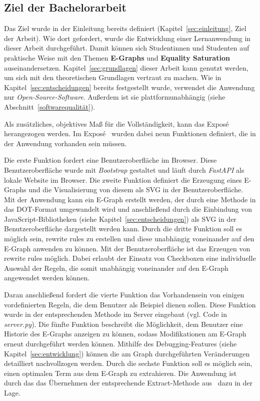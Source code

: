 \subsection{Ziel der Bachelorarbeit}\label{sub:ziel}

Das Ziel wurde in der Einleitung bereits definiert (Kapitel~\ref{sec:einleitung}, Ziel der Arbeit).
Wie dort gefordert, wurde die Entwicklung einer Lernanwendung in dieser Arbeit durchgeführt. Damit können sich Studentinnen und Studenten auf praktische Weise mit den Themen 
\textbf{E-Graphs} und \textbf{Equality Saturation} auseinandersetzen. Kapitel~\ref{sec:grundlagen} dieser Arbeit kann genutzt werden, um sich mit den
theoretischen Grundlagen vertraut zu machen. 
Wie in Kapitel~\ref{sec:entscheidungen} bereits festgestellt wurde, verwendet die Anwendung nur \textit{Open-Source-Software}. Außerdem ist
sie plattformunabhängig (siehe Abschnitt~\ref{softwarequalität}).

Als zusätzliches, objektives Maß für die Vollständigkeit, kann das Exposé herangezogen werden.
Im Exposé~\cite{expose} wurden dabei neun Funktionen definiert, die in der Anwendung vorhanden sein müssen.

Die erste Funktion fordert eine Benutzeroberfläche im Browser. Diese Benutzeroberfläche wurde mit \textit{Bootstrap} gestaltet und läuft durch \textit{FastAPI} als lokale Website 
im Browser. Die zweite Funktion definiert die Erzeugung eines E-Graphs und die Visualisierung von diesem als SVG in der Benutzeroberfläche. Mit der Anwendung kann ein E-Graph erstellt
werden, der durch eine Methode in das DOT-Format umgewandelt wird und anschließend durch die Einbindung von JavaScript-Bibliotheken (siehe Kapitel~\ref{sec:entscheidungen}) als SVG in der Benutzeroberfläche dargestellt werden kann.
Durch die dritte Funktion soll es möglich sein, rewrite rules zu erstellen und diese unabhängig voneinander auf den E-Graph anwenden zu können.  
Mit der Benutzeroberfläche ist das Erzeugen von rewrite rules möglich. Dabei erlaubt der Einsatz von Checkboxen eine individuelle Auswahl der Regeln, die somit unabhängig
voneinander auf den E-Graph angewendet werden können.

Daran anschließend fordert die vierte Funktion das Vorhandensein von einigen vordefinierten Regeln, die dem Benutzer als Beispiel dienen sollen.
Diese Funktion wurde in der entsprechenden Methode im Server eingebaut (vgl. Code in \textit{server.py}).
Die fünfte Funktion beschreibt die Möglichkeit, dem Benutzer eine Historie des E-Graphs anzeigen zu können, sodass Modifikationen am E-Graph erneut durchgeführt werden können.
Mithilfe des Debugging-Features (siehe Kapitel~\ref{sec:entwicklung}) können die am Graph durchgeführten Veränderungen detailliert nachvollzogen werden.
Durch die sechste Funktion soll es möglich sein, einen optimalen Term aus dem E-Graph zu extrahieren. 
Die Anwendung ist durch das das Übernehmen der entsprechende Extract-Methode aus~\cite{devito} dazu in der Lage.

